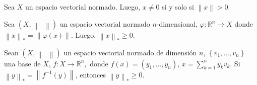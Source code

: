 \begin{prob}
    \label{prob7}
    Sea $X$ un espacio vectorial normado.
    Luego, $x\neq 0$ si y solo si $\left\|x\right\|>0$.
\end{prob}

\begin{prob}
    \label{prob8}
    Sea
    \begin{math}
        \left(
        X,
        \left\|
        \phantom{\cdot}
        \right\|
        \right)
    \end{math}
    un espacio vectorial normado $n$-dimensional,
    \begin{math}
        \varphi\colon
        \mathbb{R}^{n}\to
        X
    \end{math}
    donde
    \begin{math}
        {\left\|x\right\|}_{\ast}=
        \left\|
        \varphi
        \left(
        x
        \right)
        \right\|
    \end{math}.
    Luego,
    \begin{math}
        {\left\|x\right\|}_{\ast}\geq
        0
    \end{math}.
\end{prob}

\begin{prob}
    \label{prob9}
    Sean
    \begin{math}
        \left(
        X,
        \left\|
        \phantom{\cdot}
        \right\|
        \right)
    \end{math}
    un espacio vectorial normado de dimensión $n$,
    \begin{math}
        \left\{
        v_{1},\dotsc,
        v_{n}
        \right\}
    \end{math}
    una base de $X$,
    \begin{math}
        f\colon X\to\mathbb{R}^{n},
    \end{math}
    donde
    \begin{math}
        f\left(x\right)=
        \left(
        y_{1},
        \dotsc,
        y_{n}
        \right)
    \end{math},
    \begin{math}
        x=
        \sum_{k=1}^{n}
        y_{k}v_{k}
    \end{math}.
    Si
    \begin{math}
        {\left\|y\right\|}_{\ast}=
        \left\|
        f^{-1}
        \left(y\right)
        \right\|
    \end{math},
    entonces
    \begin{math}
        {\left\|y\right\|}_{\ast}\geq
        0
    \end{math}.
\end{prob}

